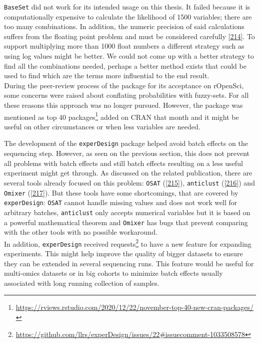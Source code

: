 \documentclass[
  a4paper,
]{book}
\DeclareRobustCommand{\href}[2]{#2\footnote{\url{#1}}}
\begin{document}
\texttt{BaseSet} did not work for its intended usage on this thesis.
It failed because it is computationally expensive to calculate the likelihood of 1500 variables; there are too many combinations.
In addition, the numeric precision of said calculations suffers from the floating point problem and must be considered carefully {[}\protect\hyperlink{ref-goldberg1991}{214}{]}.
To support multiplying more than 1000 float numbers a different strategy such as using log values might be better.
We could not come up with a better strategy to find all the combinations needed, perhaps a better method exists that could be used to find which are the terms more influential to the end result.\\
During the peer-review process of the package for its acceptance on rOpenSci, some concerns were raised about conflating probabilities with fuzzy-sets.
For all these reasons this approach was no longer pursued.
However, the package was mentioned as \href{https://rviews.rstudio.com/2020/12/22/november-top-40-new-cran-packages/}{top 40 packages} added on CRAN that month and it might be useful on other circumstances or when less variables are needed.

The development of the \texttt{experDesign} package helped avoid batch effects on the sequencing step.
However, as seen on the previous section, this does not prevent all problems with batch effects and still batch effects resulting on a less useful experiment might get through.
As discussed on the related publication, there are several tools already focused on this problem: \texttt{OSAT} ({[}\protect\hyperlink{ref-yan2012}{215}{]}), \texttt{anticlust} ({[}\protect\hyperlink{ref-papenberg2020}{216}{]}) and \texttt{Omixer} ({[}\protect\hyperlink{ref-sinke2021}{217}{]}).
But these tools have some shortcomings, that are covered by \texttt{experDesign}: \texttt{OSAT} cannot handle missing values and does not work well for arbitrary batches, \texttt{anticlust} only accepts numerical variables but it is based on a powerful mathematical theorem and \texttt{Omixer} has bugs that prevent comparing with the other tools with no possible workaround.\\
In addition, \texttt{experDesign} received \href{https://github.com/llrs/experDesign/issues/22\#issuecomment-1033508578}{requests} to have a new feature for expanding experiments.
This might help improve the quality of bigger datasets to ensure they can be extended in several sequencing runs.
This feature would be useful for multi-omics datasets or in big cohorts to minimize batch effects usually associated with long running collection of samples.
\end{document}
